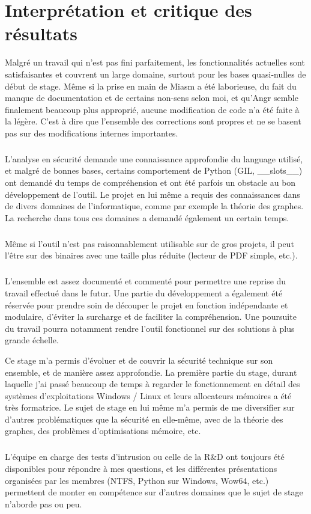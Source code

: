 \section{Interprétation et critique des résultats}
Malgré un travail qui n'est pas fini parfaitement, les fonctionnalités actuelles sont satisfaisantes et couvrent un large domaine, surtout pour les bases quasi-nulles de début de stage.
Même si la prise en main de Miasm a été laborieuse, du fait du manque de documentation et de certains non-sens selon moi, et qu'Angr semble finalement beaucoup plus approprié, aucune modification de code n'a été faite à la légère.
C'est à dire que l'ensemble des corrections sont propres et ne se basent pas sur des modifications internes importantes.
\subparagraph{}
L'analyse en sécurité demande une connaissance approfondie du language utilisé, et malgré de bonnes bases, certains comportement de Python (GIL, \_\_slots\_\_) ont demandé du temps de compréhension
et ont été parfois un obstacle au bon développement de l'outil. Le projet en lui même a requis des connaissances dans de divers domaines de l'informatique, comme par exemple la théorie des graphes.
La recherche dans tous ces domaines a demandé également un certain temps.
\subparagraph{}
Même si l'outil n'est pas raisonnablement utilisable sur de gros projets, il peut l'être sur des binaires avec une taille plus réduite (lecteur de PDF simple, etc.).
\subparagraph{}
L'ensemble est assez documenté et commenté pour permettre une reprise du travail effectué  dans le futur. Une partie du développement a également été réservée pour prendre
soin de découper le projet en fonction indépendante et modulaire, d'éviter la surcharge et de faciliter la compréhension. Une poursuite du travail pourra notamment rendre l'outil fonctionnel sur des
solutions à plus grande échelle.

Ce stage m'a permis d'évoluer et de couvrir la sécurité technique sur son ensemble, et de manière assez approfondie. La première partie du stage, durant laquelle j'ai passé beaucoup de temps à
regarder le fonctionnement en détail des systèmes d'exploitations Windows / Linux et leurs allocateurs mémoires a été très formatrice. Le sujet de stage en lui même m'a permis de me diversifier sur
d'autres problématiques que la sécurité en elle-même, avec de la théorie des graphes, des problèmes d'optimisations mémoire, etc.
\subparagraph{}
L'équipe en charge des tests d'intrusion ou celle de la R\&D ont toujours été disponibles pour répondre à mes questions, et les différentes présentations organisées par les membres (NTFS, Python sur Windows, Wow64, etc.)
permettent de monter en compétence sur d'autres domaines que le sujet de stage n'aborde pas ou peu.
